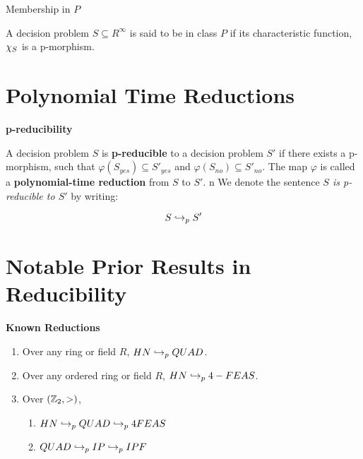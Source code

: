 
\begin{definition}{Membership in $P$}

  A decision problem $S \subseteq R^\infty$ is said to be in class $P$
  if its characteristic function, $\chi_S$ is a p-morphism.
\end{definition}

\section{Polynomial Time Reductions}

\begin{definition}{\textbf{p-reducibility}}

  A decision problem $S$ is \textbf{p-reducible} to a decision problem
  $S'$ if there exists a p-morphism,
   such that $\varphi(S_{yes})
  \subseteq S'_{yes}$ and $\varphi(S_{no}) \subseteq S'_{no}$.  The
  map $\varphi$ is called a \textbf{polynomial-time reduction} from
  $S$ to $S'$.
n
  We denote the sentence \emph{$S$ is p-reducible to $S'$} by writing:

  $$S \hookrightarrow_p S'$$
  \end{definition}


\section{Notable Prior Results in Reducibility}

\begin{theorem}{\textbf{Known Reductions}}
  \begin{enumerate}
  \item Over any ring or field $R$, $HN \hookrightarrow_p QUAD$.
  \item Over any ordered ring or field $R$, $HN \hookrightarrow_p 4-FEAS$.
  \item Over $(\mathbb{Z}_2, >)$, 
    \begin{enumerate}
    \item $HN \hookrightarrow_p QUAD \hookrightarrow_p 4FEAS$
    \item $QUAD \hookrightarrow_p IP \hookrightarrow_p IPF$
    \end{enumerate}
  \end{enumerate}
\end{theorem}

